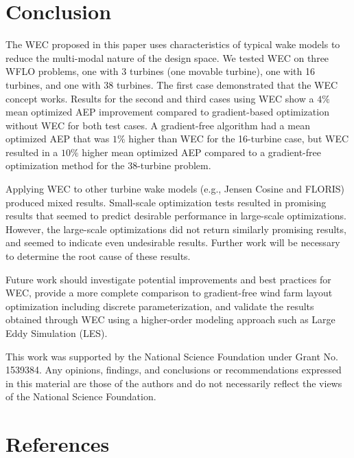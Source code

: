 \documentclass[a4paper]{jpconf}
\begin{document}
\section{Conclusion}
The WEC proposed in this paper uses characteristics of typical wake models to reduce the multi-modal nature of the design space. We tested WEC on three WFLO problems, one with 3 turbines (one movable turbine), one with 16 turbines, and one with 38 turbines. The first case demonstrated that the WEC concept works. Results for the second and third cases using WEC show a $4\%$ mean optimized AEP improvement compared to gradient-based optimization without WEC for both test cases. A gradient-free algorithm had a mean optimized AEP that was $1\%$ higher than WEC for the 16-turbine case, but WEC resulted in a $10\%$ higher mean optimized AEP compared to a gradient-free optimization method for the 38-turbine problem.

Applying WEC to other turbine wake models (e.g., Jensen Cosine and FLORIS) produced mixed results. Small-scale optimization tests resulted in promising results that seemed to predict desirable performance in large-scale optimizations. However, the large-scale optimizations did not return similarly promising results, and seemed to indicate even undesirable results. Further work will be necessary to determine the root cause of these results.


Future work should investigate potential improvements and best practices for WEC, provide a more complete comparison to gradient-free wind farm layout optimization including discrete parameterization, and validate the results obtained through WEC using a higher-order modeling approach such as Large Eddy Simulation (LES).

\ack 
This work was supported by the National Science Foundation under Grant No. 1539384. Any opinions, findings, and conclusions or recommendations expressed in this material are those of the authors and do not necessarily reflect the views of the National Science Foundation.


\section*{References}


\end{document}
